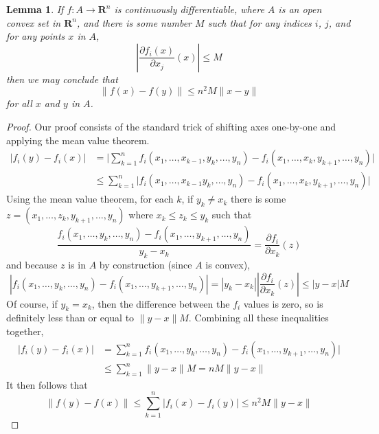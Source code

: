 \documentclass[12pt]{amsbook}
\theoremstyle{plain}
\newtheorem{lemma}[theorem]{Lemma}
\theoremstyle{definition}
\begin{document}
\begin{lemma}
    If $f:A \to \mathbf{R}^n$ is continuously differentiable, where $A$ is an open convex set in $\mathbf{R}^n$, and there is some number $M$ such that for any indices $i$, $j$, and for any points $x$ in $A$,
    \[ | \frac{\partial f_i(x)}{\partial x_j}(x) | \leq M \]
    then we may conclude that
    \[ \| f(x) - f(y) \| \leq n^2M \| x - y \| \]
    for all $x$ and $y$ in $A$.
\end{lemma}
\begin{proof}
    Our proof consists of the standard trick of shifting axes one-by-one and applying the mean value theorem.
    \begin{align*}
        | f_i(y) - f_i(x) | &= \big| \sum_{k = 1}^n f_i(x_1, \dots, x_{k-1}, y_k, \dots, y_n) - f_i(x_1, \dots, x_k, y_{k+1}, \dots, y_n) \big|\\
        &\leq \sum_{k = 1}^n \big|f_i(x_1, \dots, x_{k - 1} y_k, \dots, y_n) - f_i(x_1, \dots, x_k, y_{k+1}, \dots, y_n) \big|
    \end{align*}
    Using the mean value theorem, for each $k$, if $y_k \neq x_k$ there is some $z = (x_1, \dots, z_k, y_{k+1}, \dots, y_n)$ where $x_k \leq z_k \leq y_k$ such that
    \[ \frac{f_i(x_1, \dots, y_k, \dots, y_n) - f_i(x_1, \dots, y_{k+1}, \dots, y_n)}{y_k - x_k} = \frac{\partial f_i}{\partial x_k} (z) \]
    and because $z$ is in $A$ by construction (since $A$ is convex),
    \[ | f_i(x_1, \dots, y_k, \dots, y_n) - f_i(x_1, \dots, y_{k+1}, \dots, y_n) | = | y_k - x_k | | \frac{\partial f_i}{\partial x_k} (z) | \leq |y - x| M \]
    Of course, if $y_k = x_k$, then the difference between the $f_i$ values is zero, so is definitely less than or equal to $\|y - x\| M$. Combining all these inequalities together,
    \begin{align*}
    | f_i(y) - f_i(x) | &= \sum_{k = 1}^n f_i(x_1, \dots, y_k, \dots, y_n) - f_i(x_1, \dots, y_{k+1}, \dots, y_n) |\\
    &\leq \sum_{k = 1}^n \| y - x\| M = nM\|y - x\|
    \end{align*}
    It then follows that
    \[ \| f(y) - f(x) \| \leq \sum_{k = 1}^n |f_i(x) - f_i(y)| \leq n^2M\|y - x\| \]
\end{proof}
\end{document}
